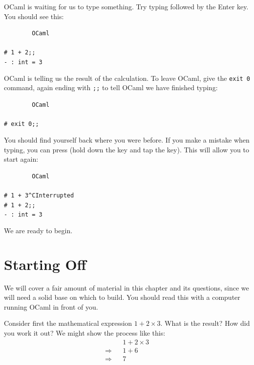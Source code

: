 \documentclass[]{book}
\newcommand{\smspace}{\vspace{4mm}}
\begin{document}
\noindent OCaml is waiting for us to type something. Try typing   \fbox{+}   \fbox{;} \fbox{;} followed by the Enter key. You should see this:


\smspace
\noindent\verb!        OCaml!\\
\noindent\\
\noindent\verb!# 1 + 2;;!\\
\noindent\verb!- : int = 3!
\smspace

\noindent OCaml is telling us the result of the calculation. To leave OCaml, give the \texttt{exit 0} command, again ending with \verb!;;! to tell OCaml we have finished typing:

\smspace
\noindent\verb!        OCaml!\\
\noindent\\
\noindent\verb!# exit 0;;!
\smspace


\noindent You should find yourself back where you were before. If you make a mistake when typing, you can press  (hold down the  key and tap the  key). This will allow you to start again:


\smspace
\noindent\verb!        OCaml!\\
\noindent\\
\noindent\verb!# 1 + 3^CInterrupted!\\
\noindent\verb!# 1 + 2;;!\\
\noindent\verb!- : int = 3!
\smspace

\noindent We are ready to begin.

\mainmatter

\pagestyle{fancy}
\chapter{Starting Off}
\label{startingoff}
We will cover a fair amount of material in this chapter and its questions, since we will need a solid base on which to build. You should read this with a computer running OCaml in front of you.

Consider first the mathematical  expression $1 + 2 \times 3$. What is the result? How did you work it out? We might show the process like this:
\begin{eqnarray*}
 & & 1 + 2 \times 3 \\
 \Longrightarrow & & 1 + 6 \\
 \Longrightarrow & & 7
\end{eqnarray*}
\end{document}
